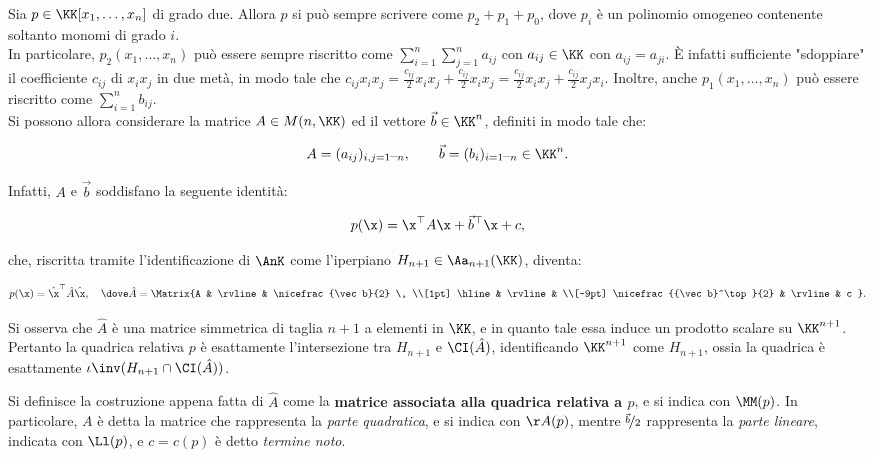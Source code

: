 \documentclass[11pt]{article}
\begin{document}
	\begin{remark} 
		Sia $p \in \KK[x_1, \ldots, x_n]$ di grado due. Allora $p$ si può sempre scrivere come $p_2 + p_1 + p_0$,
		dove $p_i$ è un polinomio omogeneo contenente soltanto monomi di grado $i$. \\
		
		In particolare, $p_2(x_1, \ldots, x_n)$ può essere sempre riscritto come $\sum_{i=1}^n \sum_{j=1}^n a_{ij}$
		con $a_{ij} \in \KK$ con $a_{ij} = a_{ji}$.
		È infatti sufficiente "sdoppiare" il coefficiente $c_{ij}$
		di $x_i x_j$ in due metà, in modo tale che $c_{ij} x_i x_j = \frac{c_{ij}}{2} x_i x_j + \frac{c_{ij}}{2} x_i x_j = \frac{c_{ij}}{2} x_i x_j + \frac{c_{ij}}{2} x_j x_i$. Inoltre, anche $p_1(x_1, \ldots, x_n)$ può essere  riscritto come $\sum_{i=1}^n b_{ij}$. \\
		
		Si possono allora considerare la matrice $A \in M(n, \KK)$ ed il vettore $\vec b \in \KK^n$, definiti in modo tale che:
		
		\[ A = (a_{ij})_{i,j=1\mbox{--}n}, \qquad \vec b = (b_i)_{i=1\mbox{--}n} \in \KK^n. \]
		
		\vskip 0.05in
		
		Infatti, $A$ e $\vec b$ soddisfano la seguente identità:
		
		\[ p(\x) = \x^\top A \x + \vec b^\top \x + c, \]
		
		\vskip 0.05in
		
		che, riscritta tramite l'identificazione di $\AnK$ come l'iperpiano $H_{n+1} \in \Aa_{n+1}(\KK)$,
		diventa:
		
		\[ p(\x) = {\hat \x}^\top \hat A \hat \x, \quad \dove \hat A = \Matrix{A & \rvline & \nicefrac{\vec b}{2} \, \\[1pt] \hline & \rvline & \\[-9pt] \nicefrac{{\vec b}^\top}{2} & \rvline & c }. \]
		
		\vskip 0.05in
		
		Si osserva che $\hat A$ è una matrice simmetrica di taglia $n+1$ a elementi in $\KK$, e in quanto
		tale essa induce un prodotto scalare su $\KK^{n+1}$. Pertanto la quadrica relativa $p$ è esattamente
		l'intersezione tra $H_{n+1}$ e $\CI(\hat A)$, identificando $\KK^{n+1}$ come $H_{n+1}$, ossia
		la quadrica è esattamente $\iota\inv(H_{n+1} \cap \CI(\hat A))$.
	\end{remark}
	
	\begin{definition}
		Si definisce la costruzione appena fatta di $\hat A$ come la \textbf{matrice associata alla quadrica relativa a $p$}, e si indica con $\MM(p)$. In particolare, $A$ è detta la matrice che rappresenta la \textit{parte quadratica}, e si indica con $\AA(p)$, mentre $\nicefrac{\vec b}2$ rappresenta la \textit{parte lineare}, indicata con $\Ll(p)$,
		e $c = c(p)$ è detto \textit{termine noto}.
	\end{definition}
	
\end{document}
